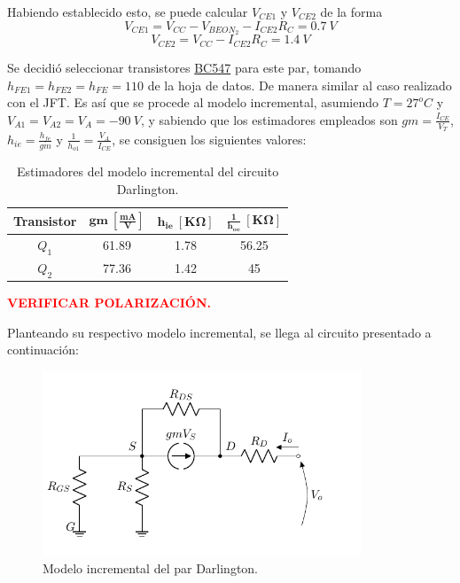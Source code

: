 Habiendo establecido esto, se puede calcular $V_{CE1}$ y $V_{CE2}$ de la forma
\begin{equation*}
	V_{CE1} = V_{CC} - V_{BEON_2} - I_{CE2} R_{C} = 0.7 \ V
\end{equation*}
\begin{equation}
	V_{CE2} = V_{CC} - I_{CE2} R_{C} = 1.4 \ V
\end{equation}



Se decidió seleccionar transistores \href{https://www.sparkfun.com/datasheets/Components/BC546.pdf}{BC547} para este par, tomando $h_{FE1} = h_{FE2} = h_{FE} = 110$ de la hoja de datos. De manera similar al caso realizado con el JFT. Es así que se procede al modelo incremental, asumiendo $T = 27^o C$ y $V_{A1} = V_{A2} = V_A = -90 \ V$, y sabiendo que los estimadores empleados son $gm = \frac{I_{CE}}{V_T}$, $h_{ie} = \frac{h_{fe}}{gm}$ y $\frac{1}{h_{o1}} = \frac{V_A}{I_{CE}}$, se consiguen los siguientes valores:
\begin{table}[H]
\centering
\begin{tabular}{cccc}
\hline
\textbf{Transistor} & $\mathbf{gm \ \left[ \frac{mA}{V} \right]}$ & $\mathbf{h_{ie} \ \left[ K\Omega \right]}$ & $\mathbf{\frac{1}{h_{oe}} \ \left[ K\Omega \right]}$ \\
\hline
$Q_1$ & 61.89 & 1.78 & 56.25 \\
$Q_2$ & 77.36 & 1.42 & 45	\\
\hline
\end{tabular}
\caption{Estimadores del modelo incremental del circuito Darlington.}
\label{tab:estim}
\end{table}

\begin{center}
	\LARGE{\textcolor{red}{\textbf{VERIFICAR POLARIZACIÓN.}}}
\end{center}

Planteando su respectivo modelo incremental, se llega al circuito presentado a continuación: 
\begin{figure}[H]
\centering
	\includegraphics[width=0.85\textwidth, page=3]{Imagenes/ModeloIncremental.pdf}
	\caption{Modelo incremental del par Darlington.}
\label{fig:incdar}
\end{figure}

